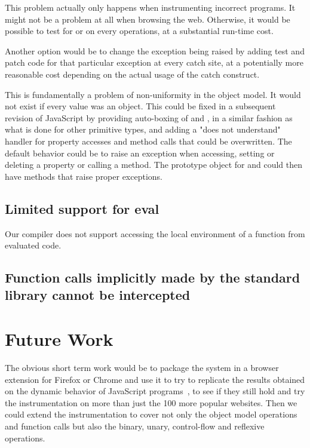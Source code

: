 This problem actually only happens when instrumenting incorrect programs. It
might not be a problem at all when browsing the web. Otherwise, it would be
possible to test for  or  on every operations, at a
substantial run-time cost.

Another option would be to change the exception being raised by adding test and
patch code for that particular exception at every catch site, at a
potentially more reasonable cost depending on the actual usage of the catch
construct.

This is fundamentally a problem of non-uniformity in the object model. It would
not exist if every value was an object.  This could be fixed in a subsequent
revision of JavaScript by providing auto-boxing of  and
, in a similar fashion as what is done for other primitive types,
and adding a "does not understand" handler for property accesses and method
calls that could be overwritten. The default behavior could be to raise an
exception when accessing, setting or deleting a property or calling a method.
The prototype object for  and  could then have methods that
raise proper exceptions.

\subsection{Limited support for eval}

Our compiler does not support accessing the local environment of a function
from evaluated code.

\subsection{Function calls implicitly made by the standard library cannot be intercepted}

\section{Future Work}

The obvious short term work would be to package the system in a browser
extension for Firefox or Chrome and use it to try to replicate the results
obtained on the dynamic behavior of JavaScript programs~\cite{behavior_js}, to
see if they still hold and try the instrumentation on more than just the 100
more popular websites. Then we could extend the instrumentation to cover not
only the object model operations and function calls but also the binary, unary,
control-flow and reflexive operations.


